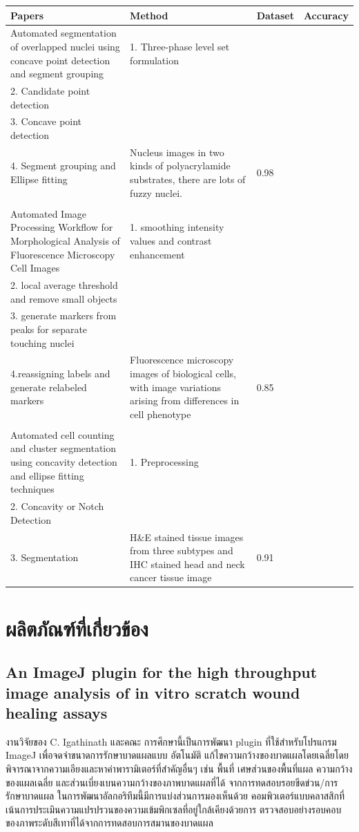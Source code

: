 \documentclass[12pt,oneside,openright,a4paper]{cpe-thai-project}
\begin{document}
\begin{table}
\begin{tabular}[!h]{p{}>{\raggedright}p{}>{\raggedright}p{}>{\centering\arraybackslash}p{}}
\toprule
Papers                                                                                                    & Method  & Dataset & Accuracy  \\ \midrule
Automated segmentation of overlapped nuclei using concave point detection and segment grouping   \cite{31}         & 1. Three-phase level set formulation \\2. Candidate point detection \\3. Concave point detection\\4. Segment grouping and Ellipse fitting   & Nucleus images in two kinds of polyacrylamide substrates, there are lots of fuzzy nuclei.      & 0.98      \\&&&\\
Automated Image Processing Workflow for Morphological Analysis of Fluorescence Microscopy Cell Images \cite{32}    & 1. smoothing intensity values and contrast enhancement \\2. local average threshold and remove small objects\\3. generate markers from peaks for separate touching nuclei\\4.reassigning labels and generate relabeled markers    & Fluorescence microscopy images of biological cells, with image variations arising from differences in cell phenotype & 0.85     \\&&&\\
Automated cell counting and cluster segmentation using concavity detection and ellipse fitting techniques \cite{33} &1. Preprocessing \\2. Concavity or Notch Detection \\3. Segmentation    &  H\&E stained tissue images from three subtypes and IHC stained head and neck cancer tissue image      & 0.91      \\ \bottomrule
\end{tabular}
\end{table}
\section{ผลิตภัณฑ์ที่เกี่ยวข้อง}
\subsection{An ImageJ plugin for the high throughput image analysis of in vitro scratch wound healing assays}
งานวิจัยของ C. Igathinath และคณะ \cite{34} การศึกษานี้เป็นการพัฒนา plugin ที่ใช้สำหรับโปรแกรม ImageJ เพื่อจดจำขนาดการรักษาบาดแผลแบบ อัตโนมัติ แก้ไขความกว้างของบาดแผลโดยเฉลี่ยโดยพิจารณาจากความเอียงและหาค่าพารามิเตอร์ที่สำคัญอื่นๆ เช่น พื้นที่ เศษส่วนของพื้นที่แผล ความกว้างของแผลเฉลี่ย และส่วนเบี่ยงเบนความกว้างของภาพบาดแผลที่ได้ จากการทดสอบรอยขีดข่วน/การรักษาบาดแผล ในการพัฒนาอัลกอริทึมนี้มีการแบ่งส่วนการมองเห็นด้วย 
คอมพิวเตอร์แบบคลาสสิกที่เน้นการประเมินความแปรปรวนของความเข้มพิกเซลที่อยู่ใกล้เคียงด้วยการ ตรวจสอบอย่างรอบคอบของภาพระดับสีเทาที่ได้จากการทดสอบการสมานของบาดแผล 
\end{document}
